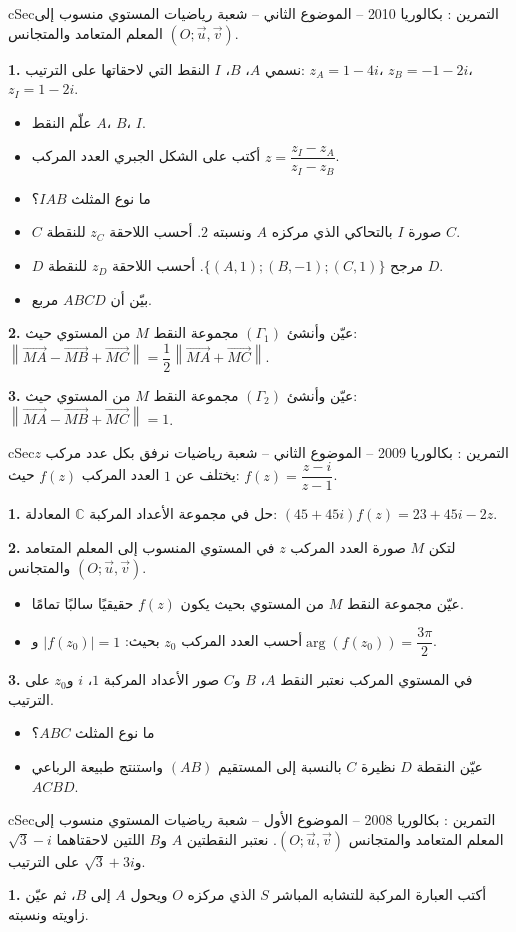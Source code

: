 \documentclass[12pt,a4paper]{article}
\newenvironment{BOX}[2]{\begin{otherlanguage}{english}\begin{arbox}{#1}{#2}}{\end{arbox}\end{otherlanguage}}
\newcounter{exo}
\newenvironment{tamrin}[1]{\stepcounter{exo}\begin{BOX}{cSec}{التمرين \theexo: #1}}{\end{BOX}}
\newenvironment{sq}{\begin{itemize}[leftmargin=2.4em,itemsep=3pt]}{\end{itemize}}
\newcommand{\qa}{\item[(أ)]}\newcommand{\qb}{\item[(ب)]}\newcommand{\qc}{\item[(جـ)]}\newcommand{\qd}{\item[(د)]}\newcommand{\qe}{\item[(هـ)]}
\newcommand{\QQ}[1]{\par\smallskip\textbf{#1.} }
\begin{document}
\begin{tamrin}{بكالوريا 2010 -- الموضوع الثاني -- شعبة رياضيات}
المستوي منسوب إلى المعلم المتعامد والمتجانس $(O;\vec u,\vec v)$.
\QQ{1} نسمي $A$، $B$، $I$ النقط التي لاحقاتها على الترتيب: $z_A=1-4i$، $z_B=-1-2i$، $z_I=1-2i$.
\begin{sq}
\qa علّم النقط $A$، $B$، $I$.
\qb أكتب على الشكل الجبري العدد المركب $z=\dfrac{z_I-z_A}{z_I-z_B}$.
\qc ما نوع المثلث $IAB$؟
\qd $C$ صورة $I$ بالتحاكي الذي مركزه $A$ ونسبته $2$. أحسب اللاحقة $z_C$ للنقطة $C$.
\qe $D$ مرجح $\{(A,1);(B,-1);(C,1)\}$. أحسب اللاحقة $z_D$ للنقطة $D$.
\item[(و)] بيّن أن $ABCD$ مربع.
\end{sq}
\QQ{2} عيّن وأنشئ $(\Gamma_1)$ مجموعة النقط $M$ من المستوي حيث: $\left\|\overrightarrow{MA}-\overrightarrow{MB}+\overrightarrow{MC}\right\|=\dfrac12\left\|\overrightarrow{MA}+\overrightarrow{MC}\right\|$.
\QQ{3} عيّن وأنشئ $(\Gamma_2)$ مجموعة النقط $M$ من المستوي حيث: $\left\|\overrightarrow{MA}-\overrightarrow{MB}+\overrightarrow{MC}\right\|=1$.
\end{tamrin}

\begin{tamrin}{بكالوريا 2009 -- الموضوع الثاني -- شعبة رياضيات}
نرفق بكل عدد مركب $z$ يختلف عن $1$ العدد المركب $f(z)$ حيث: $f(z)=\dfrac{z-i}{z-1}$.
\QQ{1} حل في مجموعة الأعداد المركبة $\mathbb C$ المعادلة: $(45+45i)f(z)=23+45i-2z$.
\QQ{2} لتكن $M$ صورة العدد المركب $z$ في المستوي المنسوب إلى المعلم المتعامد والمتجانس $(O;\vec u,\vec v)$.
\begin{sq}
\qa عيّن مجموعة النقط $M$ من المستوي بحيث يكون $f(z)$ حقيقيًا سالبًا تمامًا.
\qb أحسب العدد المركب $z_0$ بحيث: $|f(z_0)|=1$ و$\arg\left(f(z_0)\right)=\dfrac{3\pi}{2}$.
\end{sq}
\QQ{3} في المستوي المركب نعتبر النقط $A$، $B$ و$C$ صور الأعداد المركبة $1$، $i$ و$z_0$ على الترتيب.
\begin{sq}
\qa ما نوع المثلث $ABC$؟
\qb عيّن النقطة $D$ نظيرة $C$ بالنسبة إلى المستقيم $(AB)$ واستنتج طبيعة الرباعي $ACBD$.
\end{sq}
\end{tamrin}

\begin{tamrin}{بكالوريا 2008 -- الموضوع الأول -- شعبة رياضيات}
المستوي منسوب إلى المعلم المتعامد والمتجانس $(O;\vec u,\vec v)$. نعتبر النقطتين $A$ و$B$ اللتين لاحقتاهما $\sqrt3-i$ و$\sqrt3+3i$ على الترتيب.
\QQ{1} أكتب العبارة المركبة للتشابه المباشر $S$ الذي مركزه $O$ ويحول $A$ إلى $B$، ثم عيّن زاويته ونسبته.
\end{tamrin}
\end{document}
